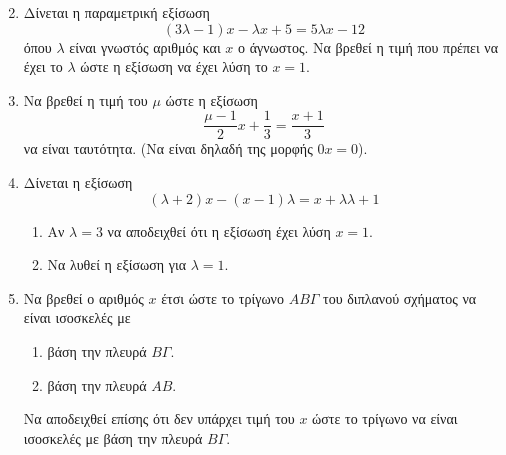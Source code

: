 \documentclass[twoside,nofonts,internet]{askhseis}
\begin{document}
\begin{enumerate}
\begin{multicols}{2}
\begin{rlist}
\end{rlist}
\end{multicols}
\item Δίνεται η παραμετρική εξίσωση \[ (3\lambda-1)x-\lambda x+5=5\lambda x-12 \]
όπου $ \lambda $ είναι γνωστός αριθμός και $ x $ ο άγνωστος. Να βρεθεί η τιμή που πρέπει να έχει το $ \lambda $ ώστε η εξίσωση να έχει λύση το $ x=1 $.
\item Να βρεθεί η τιμή του $ \mu $ ώστε η εξίσωση \[ \dfrac{\mu-1}{2}x+\dfrac{1}{3}=\dfrac{x+1}{3} \] να είναι ταυτότητα. (Να είναι δηλαδή της μορφής $ 0x=0 $).
\item Δίνεται η εξίσωση \[ (\lambda+2)x-(x-1)\lambda=x+\lambda\lambda+1 \]
\begin{enumerate}[label=\roman*.,itemsep=0mm]
\item Αν $ \lambda=3 $ να αποδειχθεί ότι η εξίσωση έχει λύση $ x=1 $.
\item Να λυθεί η εξίσωση για $ \lambda=1 $.
\end{enumerate}
\item Να βρεθεί ο αριθμός $ x $ έτσι ώστε το τρίγωνο $AB\varGamma$ του διπλανού σχήματος να είναι ισοσκελές με 
\begin{enumerate}[itemsep=0mm,label=\roman*.]
\item βάση την πλευρά $B\varGamma$.
\item βάση την πλευρά $AB$.
\end{enumerate}
Να αποδειχθεί επίσης ότι δεν υπάρχει τιμή του $x$ ώστε το τρίγωνο να είναι ισοσκελές με βάση την πλευρά $B\varGamma$.
\end{enumerate}
\end{document}
